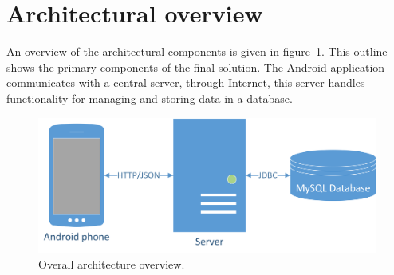 \section{Architectural overview}
An overview of the architectural components is given in figure~\ref{fig:architecture}. This outline shows the primary components of the final solution. The Android application communicates with a central server, through Internet, this server handles functionality for managing and storing data in a database.

\begin{figure}[H]
\includegraphics[width=\textwidth]{ch/architecture/fig/arch.png}
\caption{Overall architecture overview.}
\label{fig:architecture}
\end{figure}